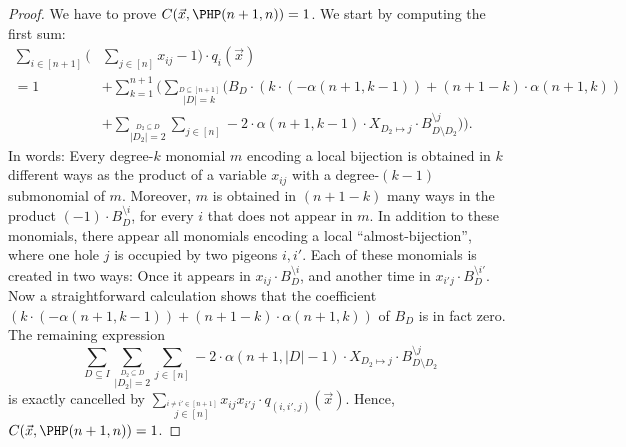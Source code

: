 \documentclass[a4paper,UKenglish,cleveref, autoref, thm-restate]{lipics-v2021}
\begin{document}
\begin{proof}
	We have to prove $C(\vec x, \PHP(n+1,n)) = 1$. We start by computing the first sum:
	\begin{align*}
		\sum_{i \in [n+1]} \Big(&\sum_{j \in [n]} x_{ij} - 1 \Big) \cdot q_i(\vec x)\\
		= 1 &+ \sum_{k = 1}^{n+1} \Big( \sum_{\stackrel{D \subseteq [n+1]}{|D| = k}} \Big( B_D \cdot ( k \cdot (- \alpha(n+1,k-1)) + (n+1-k) \cdot \alpha(n+1,k) )\\
		&+ \sum_{\stackrel{D_2 \subseteq D}{|D_2| = 2}} \sum_{j \in [n]} -2 \cdot \alpha(n+1,k-1) \cdot X_{D_2 \mapsto j} \cdot B^{\setminus j}_{D \setminus D_2} \Big) \Big).		
	\end{align*}	
	In words: Every degree-$k$ monomial $m$ encoding a local bijection is obtained in $k$ different ways as the product of a variable $x_{ij}$ with a degree-$(k-1)$ submonomial of $m$. Moreover, $m$ is obtained in $(n+1-k)$ many ways in the product $(-1) \cdot B^{\setminus i}_D$, for every $i$ that does not appear in $m$. 
	In addition to these monomials, there appear all monomials encoding a local ``almost-bijection'', where one hole $j$ is occupied by two pigeons $i, i'$. Each of these monomials is created in two ways: Once it appears in $x_{ij} \cdot B^{\setminus i}_D$, and another time in $x_{i'j} \cdot B^{\setminus i'}_D$. Now a straightforward calculation shows that the coefficient $( k \cdot (- \alpha(n+1,k-1)) + (n+1-k) \cdot \alpha(n+1,k) )$ of $B_D$ is in fact zero. The remaining expression 
	\[
	\sum_{D \subseteq I}   \sum_{\stackrel{D_2 \subseteq D}{|D_2| = 2}} \sum_{j \in [n]} -2 \cdot \alpha(n+1,|D|-1) \cdot X_{D_2 \mapsto j} \cdot B^{\setminus j}_{D \setminus D_2} 
	\]
	is exactly cancelled by $\sum_{\stackrel{i \neq i' \in [n+1]}{j \in [n]}} x_{ij}x_{i'j} \cdot q_{(i,i',j)}(\vec x)$. 
	Hence, $C(\vec x, \PHP(n+1,n)) = 1$.
\end{proof}	
\end{document}

